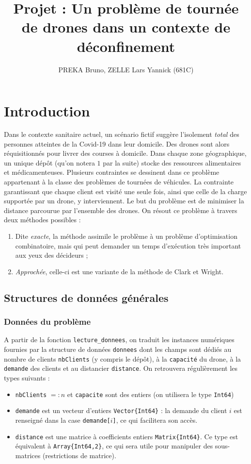\documentclass[french, 11pt, a4paper]{article} %
\title{Projet : Un problème de tournée de drones dans un contexte de déconfinement}
\author{PREKA Bruno, ZELLE Lars Yannick (681C)}
\newcommand{\smb}{\smallbreak}
\begin{document}
\maketitle



\section{Introduction}

Dans le contexte sanitaire actuel, un scénario fictif suggère l'isolement \emph{total} des personnes
atteintes de la Covid-19 dans leur domicile. Des drones sont alors réquisitionnés pour livrer des courses
à domicile.
\smb Dans chaque zone géographique, un unique dépôt (qu'on notera $1$ par la suite) stocke des ressources alimentaires et médicamenteuses.
Plusieurs contraintes se dessinent dans ce problème appartenant à la classe des problèmes de tournées de véhicules.
La contrainte garantissant que chaque client est visité une seule fois, ainsi que celle de la charge supportée par un drone,
y interviennent.
Le but du problème est de minimiser la distance parcourue par l'ensemble des drones.
\smb On résout ce problème à travers deux méthodes possibles :
\vspace{-0.2cm}
\begin{enumerate}
    \item Dite \emph{exacte}, la méthode assimile le problème à un problème d'optimisation
combinatoire, mais qui peut demander un temps d'exécution très important aux yeux des décideurs ;
    \item \emph{Approchée}, celle-ci est une variante de la méthode de Clark et Wright.
\end{enumerate}

\subsection{Structures de données générales}

\subsubsection{Données du problème}
A partir de la fonction \verb+lecture_donnees+, on traduit les instances numériques fournies
par la structure de données 
\verb+donnees+ dont les champs sont dédiés au nombre de clients \verb+nbClients+ (y compris le dépôt), à
la \verb+capacité+ du drone, à la \verb+demande+ des clients et au distancier \verb+distance+. On retrouvera régulièrement les types suivants :
\begin{itemize}
    \item \verb+nbClients+ $=:n$ et \verb+capacite+ sont des entiers (on utilisera le type \verb+Int64+)
    \item \verb+demande+ est un vecteur d'entiers \verb+Vector{Int64}+ : la demande du client $i$ est renseigné dans la case \verb+demande[+$i$\verb+]+, ce qui facilitera son accès.
    \item \verb+distance+ est une matrice à coefficients entiers \verb+Matrix{Int64}+. Ce type est équivalent à \verb+Array{Int64,2}+, ce qui sera utile pour manipuler des sous-matrices (restrictions de matrice).
\end{itemize}
\end{document}
